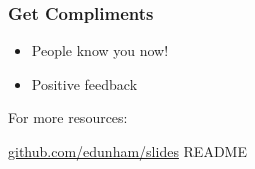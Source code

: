 \documentclass{beamer}
\begin{document}
\begin{frame}[fragile]
\frametitle{Get Compliments}
\begin{itemize}
\item People know you now!
\item Positive feedback
\end{itemize}
\end{frame}

\begin{frame}[fragile]
For more resources:

\url{github.com/edunham/slides} README
\end{frame}

\begin{frame}[fragile]
\titlepage
\end{frame}
\end{document}
